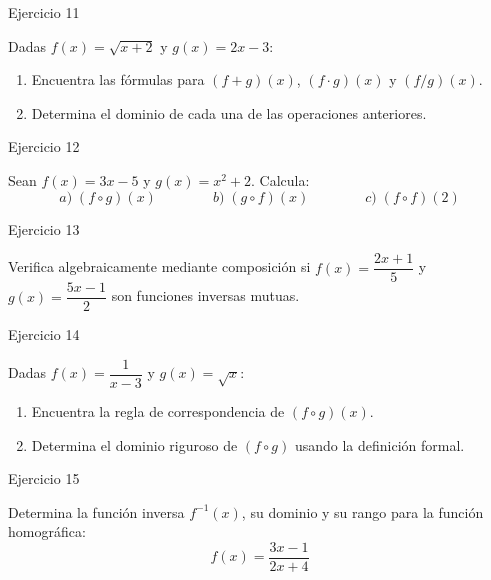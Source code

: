 \documentclass[aspectratio=169]{beamer}
\begin{document}
\begin{frame}{Ejercicio 11}
  \begin{mwejercicio}
    Dadas $f(x) = \sqrt{x + 2}$ y $g(x) = 2x - 3$:
    \begin{enumerate}
      \item Encuentra las fórmulas para $(f + g)(x)$, $(f \cdot g)(x)$ y $(f / g)(x)$.
      \item Determina el dominio de cada una de las operaciones anteriores.
    \end{enumerate}
  \end{mwejercicio}
  \vspace{3.5cm}
\end{frame}
\begin{frame}{Ejercicio 12}
  \begin{mwejercicio}
    Sean $f(x) = 3x - 5$ y $g(x) = x^2 + 2$. Calcula:
    $$a)\; (f \circ g)(x) \qquad\qquad b)\; (g \circ f)(x) \qquad\qquad c)\; (f \circ f)(2)$$
  \end{mwejercicio}
  \vspace{3.5cm}
\end{frame}
\begin{frame}{Ejercicio 13}
  \begin{mwejercicio}
    Verifica algebraicamente mediante composición si $f(x) = \dfrac{2x + 1}{5}$ y $g(x) = \dfrac{5x - 1}{2}$ son funciones inversas mutuas.
  \end{mwejercicio}
  \vspace{3.5cm}
\end{frame}
\begin{frame}{Ejercicio 14}
  \begin{mwejercicio}
    Dadas $f(x) = \dfrac{1}{x - 3}$ y $g(x) = \sqrt{x}$:
    \begin{enumerate}
      \item Encuentra la regla de correspondencia de $(f \circ g)(x)$.
      \item Determina el dominio riguroso de $(f \circ g)$ usando la definición formal.
    \end{enumerate}
  \end{mwejercicio}
  \vspace{3.5cm}
\end{frame}
\begin{frame}{Ejercicio 15}
  \begin{mwejercicio}
    Determina la función inversa $f^{-1}(x)$, su dominio y su rango para la función homográfica:
    $$f(x) = \frac{3x - 1}{2x + 4}$$
  \end{mwejercicio}
  \vspace{3.5cm}
\end{frame}
\end{document}
